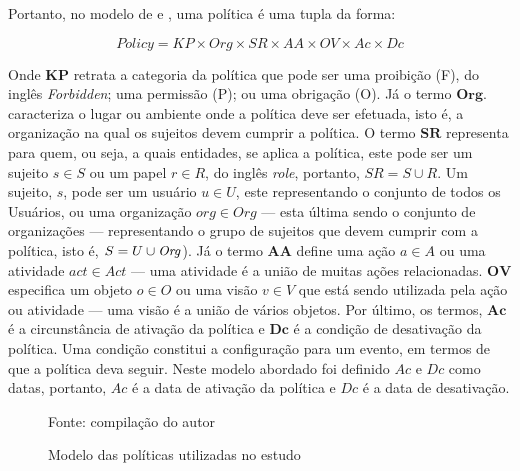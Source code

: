 Portanto, no modelo de  e , uma política é uma tupla da forma:

	\begin{equation}\label{politica}
	Policy = KP \times Org \times SR \times AA \times OV \times Ac \times Dc
	\end{equation}
	
Onde $ \textbf{KP} $ retrata a categoria da política que pode ser uma proibição (F), do inglês \textit{Forbidden}; uma permissão (P); ou uma obrigação (O). Já o termo $ \textbf{Org} $. caracteriza o lugar ou ambiente onde a política deve ser efetuada, isto é, a organização na qual os sujeitos devem cumprir a política. O termo $ \textbf{SR} $ representa para quem, ou seja, a quais entidades, se aplica a política, este pode ser um sujeito $ s \in S $ ou um papel $ r \in R $, do inglês \textit{role}, portanto, $ SR = S \cup R $. Um sujeito, $ s $, pode ser um usuário $ u \in U $, este representando o conjunto de todos os Usuários, ou uma organização $ org \in Org $ --- esta última sendo o conjunto de organizações --- representando o grupo de sujeitos que devem cumprir com a política, isto é, $ S = U \cup \textrm{\textit{Org}} $). Já o termo $ \textbf{AA} $ define uma ação $ a \in A  $ ou uma atividade $ act \in Act  $ --- uma atividade é a união de muitas ações relacionadas. $ \textbf{OV} $ especifica um objeto $ o \in O $ ou uma visão $ v \in V $ que está sendo utilizada pela ação ou atividade --- uma visão é a união de vários objetos. Por último, os termos, $ \textbf{Ac} $ é a circunstância de ativação da política e $ \textbf{Dc} $ é a condição de desativação da política. Uma condição constitui a configuração para um evento, em termos de que a política deva seguir. Neste modelo abordado foi definido $ Ac $ e $ Dc $ como datas, portanto, $ Ac $ é a data de ativação da política e $ Dc $ é a data de desativação.

\begin{figure}[h!]
	\centering
	\caption{Modelo das políticas utilizadas no estudo}
	
	{\scriptsize Fonte: compilação do autor}
	\label{fig:modelo_politica}
\end{figure}

